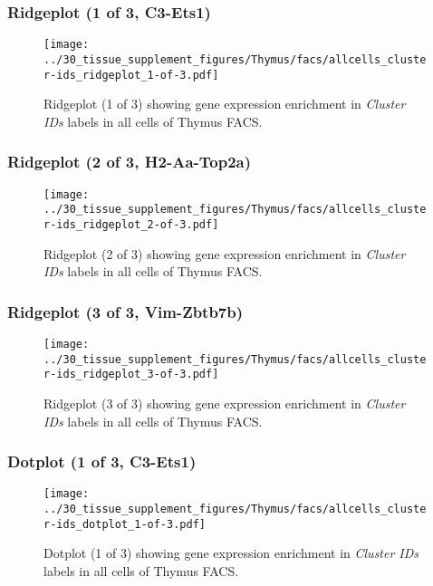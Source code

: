 \clearpage

\subsubsection{Ridgeplot (1 of 3, C3-Ets1)}
\begin{figure}[h]
\centering
\texttt{[image: ../30\_tissue\_supplement\_figures/Thymus/facs/allcells\_cluster-ids\_ridgeplot\_1-of-3.pdf]}

\caption{ Ridgeplot (1 of 3)  showing gene expression enrichment in \emph{Cluster IDs} labels in all cells of Thymus FACS. }
\end{figure}


\clearpage

\subsubsection{Ridgeplot (2 of 3, H2-Aa-Top2a)}
\begin{figure}[h]
\centering
\texttt{[image: ../30\_tissue\_supplement\_figures/Thymus/facs/allcells\_cluster-ids\_ridgeplot\_2-of-3.pdf]}

\caption{ Ridgeplot (2 of 3)  showing gene expression enrichment in \emph{Cluster IDs} labels in all cells of Thymus FACS. }
\end{figure}


\clearpage

\subsubsection{Ridgeplot (3 of 3, Vim-Zbtb7b)}
\begin{figure}[h]
\centering
\texttt{[image: ../30\_tissue\_supplement\_figures/Thymus/facs/allcells\_cluster-ids\_ridgeplot\_3-of-3.pdf]}

\caption{ Ridgeplot (3 of 3)  showing gene expression enrichment in \emph{Cluster IDs} labels in all cells of Thymus FACS. }
\end{figure}


\clearpage

\subsubsection{Dotplot (1 of 3, C3-Ets1)}
\begin{figure}[h]
\centering
\texttt{[image: ../30\_tissue\_supplement\_figures/Thymus/facs/allcells\_cluster-ids\_dotplot\_1-of-3.pdf]}

\caption{ Dotplot (1 of 3)  showing gene expression enrichment in \emph{Cluster IDs} labels in all cells of Thymus FACS. }
\end{figure}



